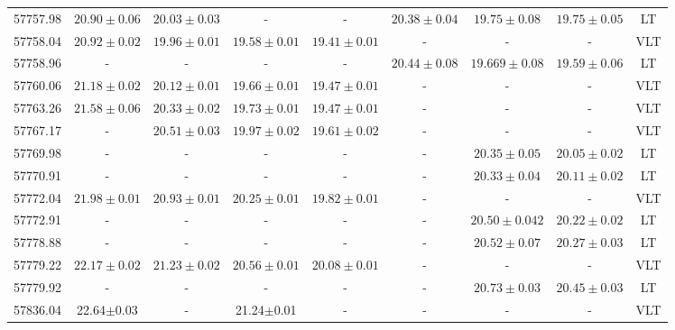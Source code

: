 \documentclass[fleqn,usenatbib]{mnras}
\begin{document}
\begin{table}
\begin{tabular}{ccccccccc}
57757.98 &  $20.90 \pm{0.06}$  &  $20.03 \pm{0.03}$  &  -  &  -  &  $20.38 \pm{0.04}$  &  $19.75 \pm{0.08}$  &  $19.75 \pm{0.05}$  &  LT \\
57758.04 &  $20.92 \pm{0.02}$  &  $19.96 \pm{0.01}$  &  $19.58 \pm{0.01}$  &  $19.41 \pm{0.01}$  &  -  &  -  &  -  &  VLT \\
57758.96 &  -  &  -  &  -  &  -  &  $20.44 \pm{0.08}$  &  $19.669 \pm{0.08}$  &  $19.59 \pm{0.06}$  &  LT \\
57760.06 &  $21.18 \pm{0.02}$  &  $20.12 \pm{0.01}$  &  $19.66 \pm{0.01}$  &  $19.47 \pm{0.01}$  &  -  &  -  &  -  &  VLT \\
57763.26 &  $21.58 \pm{0.06}$  &  $20.33 \pm{0.02}$  &  $19.73 \pm{0.01}$  &  $19.47 \pm{0.01}$  &  -  &  -  &  -  &  VLT \\
57767.17 &  -  &  $20.51 \pm{0.03}$  &  $19.97 \pm{0.02}$  &  $19.61 \pm{0.02}$  &  -  &  -  &  -  &  VLT \\
57769.98 &  -  &  -  &  -  &  -  &  -  &  $20.35 \pm{0.05}$  &  $20.05 \pm{0.02}$  &  LT \\
57770.91 &  -  &  -  &  -  &  -  &  -  &  $20.33 \pm{0.04}$  &  $20.11 \pm{0.02}$  &  LT \\
57772.04 &  $21.98 \pm{0.01}$  &  $20.93 \pm{0.01}$  &  $20.25 \pm{0.01}$  &  $19.82 \pm{0.01}$  &  -  &  -  &  -  &  VLT \\
57772.91 &  -  &  -  &  -  &  -  &  -  &  $20.50 \pm{0.042}$  &  $20.22 \pm{0.02}$  &  LT \\
57778.88 &  -  &  -  &  -  &  -  &  -  &  $20.52 \pm{0.07}$  &  $20.27 \pm{0.03}$  &  LT \\
57779.22 &  $22.17 \pm{0.02}$  &  $21.23 \pm{0.02}$  &  $20.56 \pm{0.01}$  &  $20.08 \pm{0.01}$  &  -  &  -  &  -  &  VLT \\
57779.92 &  -  &  -  &  -  &  -  &  -  &  $20.73 \pm{0.03}$  &  $20.45 \pm{0.03}$  &  LT \\
57836.04&22.64$\pm$0.03 &-&21.24$\pm$0.01&-&-&-&-&VLT \\
   \hline
\end{tabular}
\label{table:logofphot}
\end{table}

\end{document}
